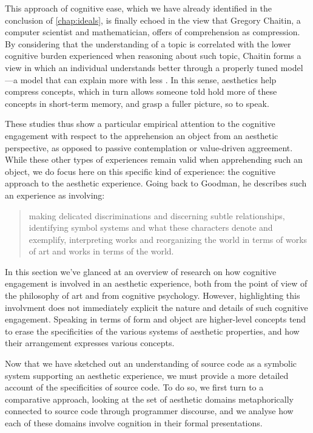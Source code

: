 This approach of cognitive ease, which we have already identified in the conclusion of \autoref{chap:ideals}, is finally echoed in the view that Gregory Chaitin, a computer scientist and mathematician, offers of comprehension as compression. By considering that the understanding of a topic is correlated with the lower cognitive burden experienced when reasoning about such topic, Chaitin forms a view in which an individual understands better through a properly tuned model—a model that can explain more with less \citep{zenil_compression_2021}. In this sense, aesthetics help compress concepts, which in turn allows someone told hold more of these concepts in short-term memory, and grasp a fuller picture, so to speak.

These studies thus show a particular empirical attention to the cognitive engagement with respect to the apprehension an object from an aesthetic perspective, as opposed to passive contemplation or value-driven aggreement. While these other types of experiences remain valid when apprehending such an object, we do focus here on this specific kind of experience: the cognitive approach to the aesthetic experience. Going back to Goodman, he describes such an experience as involving:

\begin{quote}
    making delicated discriminations and discerning subtle relationships, identifying symbol systems and what these characters denote and exemplify, interpreting works and reorganizing the world in terms of works of art and works in terms of the world. \citep{goodman_languages_1976}
\end{quote}

\spacersmall

In this section we've glanced at an overview of research on how cognitive engagement is involved in an aesthetic experience, both from the point of view of the philosophy of art and from cognitive psychology. However, highlighting this involvment does not immediately explicit the nature and details of such cognitive engagement. Speaking in terms of form and object are higher-level concepts tend to erase the specificities of the various systems of aesthetic properties, and how their arrangement expresses various concepts.

Now that we have sketched out an understanding of source code as a symbolic system supporting an aesthetic experience, we must provide a more detailed account of the specificities of source code. To do so, we first turn to a comparative approach, looking at the set of aesthetic domains metaphorically connected to source code through programmer discourse, and we analyse how each of these domains involve cognition in their formal presentations.

